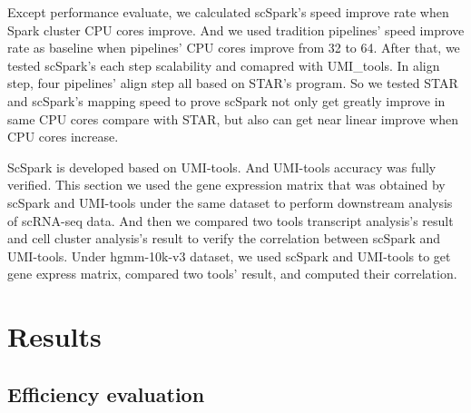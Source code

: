 \documentclass[conference]{IEEEtran}
\begin{document}
Except performance evaluate, we calculated scSpark's speed improve rate when Spark cluster CPU cores improve.
And we used tradition pipelines' speed improve rate as baseline when pipelines' CPU cores improve from 32 to 64.
After that, we tested scSpark's each step scalability and comapred with UMI\_tools.
In align step, four pipelines' align step all based on STAR's program.
So we tested STAR and scSpark's mapping speed to prove scSpark not only get greatly improve in same CPU cores compare with STAR, but also can get near linear improve when CPU cores increase.

ScSpark is developed based on UMI-tools. 
And UMI-tools accuracy was fully verified. 
This section we used the gene expression matrix that was obtained by scSpark and UMI-tools under the same dataset to perform downstream analysis of scRNA-seq data. 
And then we compared two tools transcript analysis's result and cell cluster analysis's result to verify the correlation between scSpark and UMI-tools. 
Under hgmm-10k-v3 dataset, we used scSpark and UMI-tools to get gene express matrix, compared two tools' result, and computed their correlation.

\section{Results}

\subsection{Efficiency evaluation}
\end{document}
